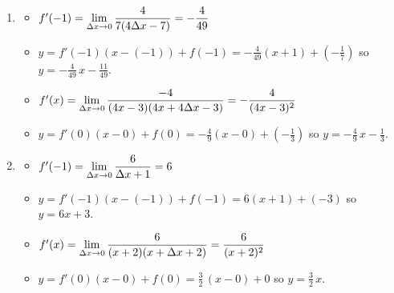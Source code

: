 \begin{enumerate}
\setcounter{enumi}{\value{HW}}

\item \begin{itemize}

\item  $f'(-1) =\displaystyle{ \lim_{\Delta x \rightarrow 0} \dfrac{4}{7(4 \Delta x - 7)} = - \dfrac{4}{49}}$

\smallskip

\item $y = f'(-1)(x-(-1)) + f(-1) = -\frac{4}{49}(x + 1) + \left(-\frac{1}{7}\right)$ so $y = -\frac{4}{49} \, x - \frac{11}{49}$.   

\smallskip

\item  $f'(x) = \displaystyle{ \lim_{\Delta x \rightarrow 0} \dfrac{-4}{(4x-3)(4x+4\Delta x-3)} =  - \dfrac{4}{(4x-3)^2}}$  

\smallskip

\item $y = f'(0)(x-0)+f(0) = -\frac{4}{9} (x-0) + \left(-\frac{1}{3}\right)$ so $y = -\frac{4}{9} \, x - \frac{1}{3}$.

\smallskip

\end{itemize}
   
\item \begin{itemize}

\item  $f'(-1) = \displaystyle{ \lim_{\Delta x \rightarrow 0} \dfrac{6}{\Delta x + 1}= 6}$

\smallskip

\item $y = f'(-1)(x-(-1)) + f(-1) = 6(x+1) + (-3)$ so $y = 6x+3$.

\smallskip

\item  $f'(x) =\displaystyle{ \lim_{\Delta x \rightarrow 0} \dfrac{6}{(x+2)(x+\Delta x+2)} =   \dfrac{6}{(x+2)^2}}$ 

\smallskip    

\item  $y = f'(0)(x-0) + f(0) = \frac{3}{2} \, (x-0)+0$ so $y = \frac{3}{2} \, x$.


\smallskip


\end{itemize}

 
\setcounter{HW}{\value{enumi}}
\end{enumerate}

